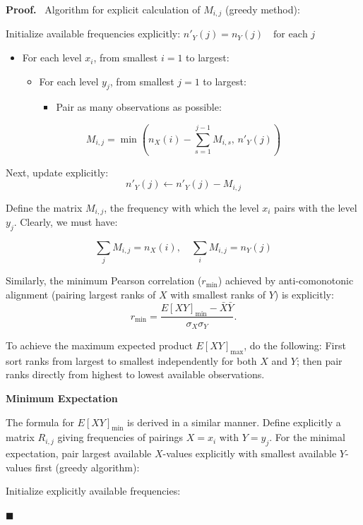 \documentclass[
  12pt,
]{article}
\providecommand{\tightlist}{%
  \setlength{\itemsep}{0pt}\setlength{\parskip}{0pt}}
\theoremstyle{plain}
\theoremstyle{definition}
\renewenvironment{proof}
   {\par\noindent\textbf{Proof.}\ }
   {\hfill$\blacksquare$\par}
\theoremstyle{remark}
\begin{document}
\begin{proof}
Algorithm for explicit calculation of \(M_{i,j}\) (greedy method):

Initialize available frequencies explicitly:
\(n'_Y(j)=n_Y(j)\quad\text{for each }j\)

\begin{itemize}
\item
  For each level \(x_i\), from smallest \(i=1\) to largest:

  \begin{itemize}
  \item
    For each level \(y_j\), from smallest \(j=1\) to largest:

    \begin{itemize}
    \tightlist
    \item
      Pair as many observations as possible:
    \end{itemize}
  \end{itemize}
\end{itemize}

\[M_{i,j}=\min\left(n_X(i)-\sum_{s=1}^{j-1}M_{i,s},\, n'_Y(j)\right)\]

Next, update explicitly: \[n'_Y(j)\leftarrow n'_Y(j)-M_{i,j}\]

Define the matrix \(M_{i,j}\), the frequency with which the level
\(x_i\) pairs with the level \(y_j\). Clearly, we must have:

\[\sum_j M_{i,j}=n_X(i),\quad\sum_i M_{i,j}=n_Y(j)\]

Similarly, the minimum Pearson correlation (\(r_{\text{min}}\)) achieved
by anti-comonotonic alignment (pairing largest ranks of \(X\) with
smallest ranks of \(Y\)) is explicitly:
\[r_{\text{min}} = \frac{E[XY]_{\text{min}} - \bar{X}\bar{Y}}{\sigma_X \sigma_Y}.\]

To achieve the maximum expected product \(E[XY]_{\text{max}}\), do the
following: First sort ranks from largest to smallest independently for
both \(X\) and \(Y\); then pair ranks directly from highest to lowest
available observations.

\textbf{Minimum Expectation}

The formula for \(E[XY]_{\text{min}}\) is derived in a similar manner.
Define explicitly a matrix \(R_{i,j}\) giving frequencies of pairings
\(X=x_i\) with \(Y=y_j\). For the minimal expectation, pair largest
available \(X\)-values explicitly with smallest available \(Y\)-values
first (greedy algorithm):

Initialize explicitly available frequencies:


\end{proof}
\end{document}
